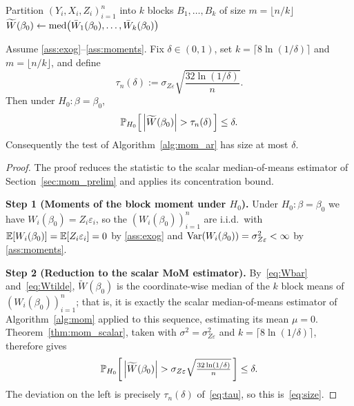 \begin{algorithm}[htbp]
\label{alg:mom_ar}
\caption{Median-of-Means Anderson--Rubin Test}
Partition $(Y_i,X_i,Z_i)_{i=1}^{n}$ into $k$ blocks $B_1,\dots,B_k$ of size
$m=\lfloor n/k\rfloor$\;
$\widetilde{W}(\beta_0) \leftarrow
  \operatorname{med}\bigl(\bar{W}_1(\beta_0),\dots,\bar{W}_k(\beta_0)\bigr)$\;
\;
\end{algorithm}


\begin{theorem}
\label{thm:mom_ar_size}
Assume \ref{ass:exog}--\ref{ass:moments}. Fix $\delta\in(0,1)$, set
$k=\lceil 8\ln(1/\delta)\rceil$ and $m=\lfloor n/k\rfloor$, and define
\begin{equation}
  \tau_n(\delta) := \sigma_{Z\varepsilon}\sqrt{\frac{32\ln(1/\delta)}{n}}.
  \label{eq:tau}
\end{equation}
Then under $H_0\colon\beta=\beta_0$,
\begin{equation}
  \operatorname{\mathbb{P}}_{H_0}\!\left[\,\left|\widetilde{W}(\beta_0)\right| > \tau_n(\delta)\,\right]
    \le \delta.
  \label{eq:size}
\end{equation}
Consequently the test of Algorithm~\ref{alg:mom_ar} has size at most $\delta$.
\end{theorem}
 
\begin{proof}
The proof reduces the statistic to the scalar median-of-means estimator of Section~\ref{sec:mom_prelim} and applies its concentration bound.

\medskip\noindent\textbf{Step 1 (Moments of the block moment under $H_0$).} Under $H_0\colon\beta=\beta_0$ we have $W_i(\beta_0)=Z_i\varepsilon_i$, so the $(W_i(\beta_0))_{i=1}^{n}$ are i.i.d.\ with $\operatorname{\mathbb{E}}[W_i(\beta_0)] = \operatorname{\mathbb{E}}[Z_i\varepsilon_i] = 0$ by \ref{ass:exog} and $\operatorname{Var}(W_i(\beta_0)) = \sigma_{Z\varepsilon}^2 < \infty$ by \ref{ass:moments}.

\medskip\noindent\textbf{Step 2 (Reduction to the scalar MoM estimator).} By~\eqref{eq:Wbar} and~\eqref{eq:Wtilde}, $\widetilde{W}(\beta_0)$ is the coordinate-wise median of the $k$ block means of $(W_i(\beta_0))_{i=1}^{n}$; that is, it is exactly the scalar median-of-means estimator of Algorithm~\ref{alg:mom} applied to this sequence, estimating its mean $\mu = 0$. Theorem~\ref{thm:mom_scalar}, taken with $\sigma^2 = \sigma_{Z\varepsilon}^2$ and $k = \lceil 8\ln(1/\delta)\rceil$, therefore gives
\[
  \operatorname{\mathbb{P}}_{H_0}\!\left[\,\left|\widetilde{W}(\beta_0)\right|
       > \sigma_{Z\varepsilon}\sqrt{\tfrac{32\ln(1/\delta)}{n}}\,\right]
       \le \delta.
\]
The deviation on the left is precisely $\tau_n(\delta)$ of~\eqref{eq:tau}, so this is~\eqref{eq:size}.
\end{proof}


